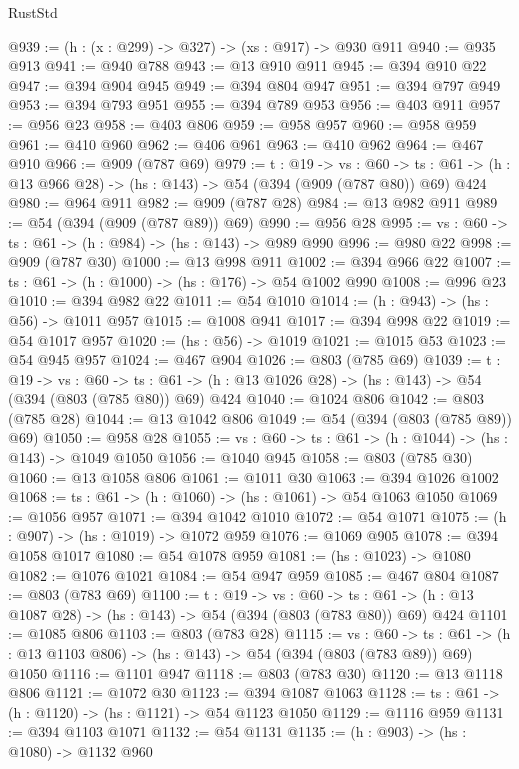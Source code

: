 \begin{lexlean}{RustStd}
\begin{coremodule}
{\begin{coremodule}
{{{{{{{{@939 := (h : (x : @299) -> @327) -> (xs : @917) -> @930 @911
@940 := @935 @913
@941 := @940 @788
@943 := @13 @910 @911
@945 := @394 @910 @22
@947 := @394 @904 @945
@949 := @394 @804 @947
@951 := @394 @797 @949
@953 := @394 @793 @951
@955 := @394 @789 @953
@956 := @403 @911
@957 := @956 @23
@958 := @403 @806
@959 := @958 @957
@960 := @958 @959
@961 := @410 @960
@962 := @406 @961
@963 := @410 @962
@964 := @467 @910
@966 := @909 (@787 @69)
@979 := {t : @19} ->
  {vs : @60} ->
  {ts : @61} -> (h : @13 @966 @28) -> (hs : @143) -> @54 (@394 (@909 (@787 @80)) @69) @424
@980 := @964 @911
@982 := @909 (@787 @28)
@984 := @13 @982 @911
@989 := @54 (@394 (@909 (@787 @89)) @69)
@990 := @956 @28
@995 := {vs : @60} -> {ts : @61} -> (h : @984) -> (hs : @143) -> @989 @990
@996 := @980 @22
@998 := @909 (@787 @30)
@1000 := @13 @998 @911
@1002 := @394 @966 @22
@1007 := {ts : @61} -> (h : @1000) -> (hs : @176) -> @54 @1002 @990
@1008 := @996 @23
@1010 := @394 @982 @22
@1011 := @54 @1010
@1014 := (h : @943) -> (hs : @56) -> @1011 @957
@1015 := @1008 @941
@1017 := @394 @998 @22
@1019 := @54 @1017 @957
@1020 := (hs : @56) -> @1019
@1021 := @1015 @53
@1023 := @54 @945 @957
@1024 := @467 @904
@1026 := @803 (@785 @69)
@1039 := {t : @19} ->
  {vs : @60} ->
  {ts : @61} -> (h : @13 @1026 @28) -> (hs : @143) -> @54 (@394 (@803 (@785 @80)) @69) @424
@1040 := @1024 @806
@1042 := @803 (@785 @28)
@1044 := @13 @1042 @806
@1049 := @54 (@394 (@803 (@785 @89)) @69)
@1050 := @958 @28
@1055 := {vs : @60} -> {ts : @61} -> (h : @1044) -> (hs : @143) -> @1049 @1050
@1056 := @1040 @945
@1058 := @803 (@785 @30)
@1060 := @13 @1058 @806
@1061 := @1011 @30
@1063 := @394 @1026 @1002
@1068 := {ts : @61} -> (h : @1060) -> (hs : @1061) -> @54 @1063 @1050
@1069 := @1056 @957
@1071 := @394 @1042 @1010
@1072 := @54 @1071
@1075 := (h : @907) -> (hs : @1019) -> @1072 @959
@1076 := @1069 @905
@1078 := @394 @1058 @1017
@1080 := @54 @1078 @959
@1081 := (hs : @1023) -> @1080
@1082 := @1076 @1021
@1084 := @54 @947 @959
@1085 := @467 @804
@1087 := @803 (@783 @69)
@1100 := {t : @19} ->
  {vs : @60} ->
  {ts : @61} -> (h : @13 @1087 @28) -> (hs : @143) -> @54 (@394 (@803 (@783 @80)) @69) @424
@1101 := @1085 @806
@1103 := @803 (@783 @28)
@1115 := {vs : @60} ->
  {ts : @61} -> (h : @13 @1103 @806) -> (hs : @143) -> @54 (@394 (@803 (@783 @89)) @69) @1050
@1116 := @1101 @947
@1118 := @803 (@783 @30)
@1120 := @13 @1118 @806
@1121 := @1072 @30
@1123 := @394 @1087 @1063
@1128 := {ts : @61} -> (h : @1120) -> (hs : @1121) -> @54 @1123 @1050
@1129 := @1116 @959
@1131 := @394 @1103 @1071
@1132 := @54 @1131
@1135 := (h : @903) -> (hs : @1080) -> @1132 @960
}}}}}}}}
\end{coremodule}}
\end{coremodule}
\end{lexlean}
